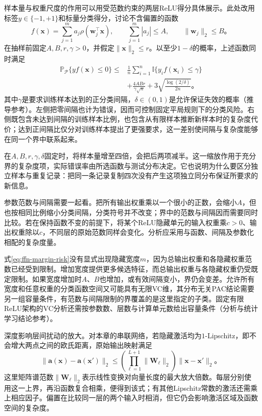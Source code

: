 样本量与权重尺度的作用可以用受范数约束的两层ReLU得分具体展示。此处改用标签$y\in\{-1,+1\}$和标量分类得分，讨论不含偏置的函数
\[
  f(\bm{x})=\sum_{j=1}^{m}a_j\rho(\bm{w}_j^{\top}\bm{x}),
  \qquad \sum_{j=1}^{m}|a_j|\leq A,
  \qquad \lVert\bm{w}_j\rVert_2\leq B\text{。}
\]
在抽样前固定$A,B,r,\gamma>0$，并假定$\lVert\bm{x}\rVert_2\leq r$。以至少$1-\delta$的概率，上述函数同时满足
\begin{equation}
  \begin{aligned}
    \mathbb{P}_{\mathcal{P}}\{yf(\bm{x})\leq0\}
    \leq{}&\frac1n\sum_{i=1}^{n}
      \mathbb{I}\{y_i f(\bm{x}_i)\leq\gamma\}\\
    &+\frac{4ABr}{\gamma\sqrt n}
      +3\sqrt{\frac{\log(2/\delta)}{2n}}\text{。}
  \end{aligned}
  \label{eq:ffn-margin-risk}
\end{equation}
其中$\gamma$是要求训练样本达到的正分类间隔，$\delta\in(0,1)$是允许保证失效的概率（推导参考）。左侧把零间隔也计为错误，因而可控制固定平局规则下的分类风险。右侧既包含未达到间隔的训练样本比例，也包含从有限样本推断新样本时的复杂度代价；达到正间隔比仅分对训练样本提出了更强要求，这一差别使间隔与复杂度能够在同一个界中联系起来。

在$A,B,r,\gamma,\delta$固定时，将样本量增至四倍，会把后两项减半。这一缩放作用于充分界的复杂度项，实际错误率由所选函数与测试分布决定。它也说明为什么要区分独立样本与重复记录：把同一条记录复制四次没有产生这项独立同分布保证所要求的新信息。

参数范数与间隔需要一起看。把所有输出权重乘以一个很小的正数，会缩小$A$，但也按相同比例缩小分类间隔，分类符号并不改变；界中的范数与间隔因而需要同时比较。若在保持函数不变的前提下，将某个ReLU隐藏单元的输入权重乘$c>0$、输出权重除以$c$，不同层的原始范数同样会变化。分析应采用与函数、间隔及参数化相配的复杂度量。

式\eqref{eq:ffn-margin-risk}没有显式出现隐藏宽度$m$，因为总输出权重和各隐藏权重范数已经受到限制。增加宽度提供更多候选特征，而总输出权重与各隐藏权重仍受既定限制。如果宽度增加时$A$、$B$也增加，或有效间隔变小，界仍会变差。允许所有宽度和任意权重的分类函数空间又可能具有无限VC维，其分布无关PAC结论需要另一组容量条件，有范数与间隔限制的界覆盖的是这里指定的子类。固定有限ReLU架构的VC分析还需按参数数、层数与计算单元数给出容量条件（分析与统计学习结论参考）。

深度影响层间扰动的放大。对本章的串联网络，若隐藏激活均为$1$-Lipschitz，即不会增大两点之间的欧氏距离，原始输出映射满足
\begin{equation}
  \lVert\bm{a}(\bm{x})-\bm{a}(\bm{x}')\rVert_2
  \leq
  \left(\prod_{\ell=1}^{L+1}\lVert\bm{W}_\ell\rVert_2\right)
  \lVert\bm{x}-\bm{x}'\rVert_2\text{。}
  \label{eq:ffn-input-sensitivity}
\end{equation}
这里矩阵谱范数$\lVert\bm{W}_\ell\rVert_2$表示线性变换对向量长度的最大放大倍数。每层分别使用这一上界，再沿函数复合相乘，便得到该式；有其他Lipschitz常数的激活还需乘上相应因子。偏置在比较同一层的两个输入时相消，但它仍会影响激活区域及函数空间的复杂度。

